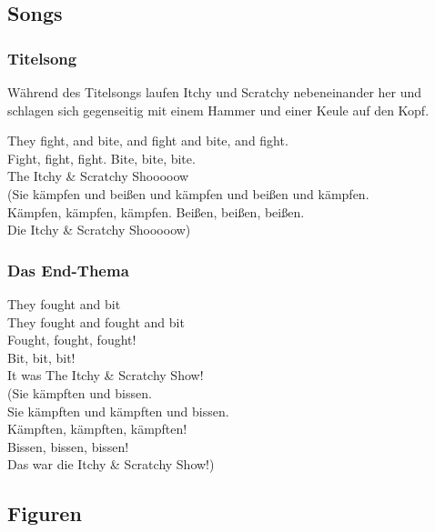 \begin{appendix}
\subsection{Songs}

\subsubsection{Titelsong}
Während des Titelsongs laufen Itchy und Scratchy nebeneinander her und schlagen sich gegenseitig mit einem Hammer und einer Keule auf den Kopf.

\begin{lyricquote}
	  They fight, and bite, and fight and bite, and fight.\\
    Fight, fight, fight. Bite, bite, bite.\\
    The Itchy \& Scratchy Shooooow\\

    (Sie kämpfen und beißen und kämpfen und beißen und kämpfen.\\
    Kämpfen, kämpfen, kämpfen. Beißen, beißen, beißen.\\
    Die Itchy \& Scratchy Shooooow) 
\end{lyricquote}


\subsubsection{Das End-Thema}

\begin{lyricquote}
	  They fought and bit\\
		They fought and fought and bit\\
		Fought, fought, fought!\\
		Bit, bit, bit!\\
		It was The Itchy \& Scratchy Show!\\

    (Sie kämpften und bissen.\\
    Sie kämpften und kämpften und bissen.\\
    Kämpften, kämpften, kämpften!\\
    Bissen, bissen, bissen!\\
    Das war die Itchy \& Scratchy Show!) 
\end{lyricquote}


\subsection{Figuren}


\end{appendix}
